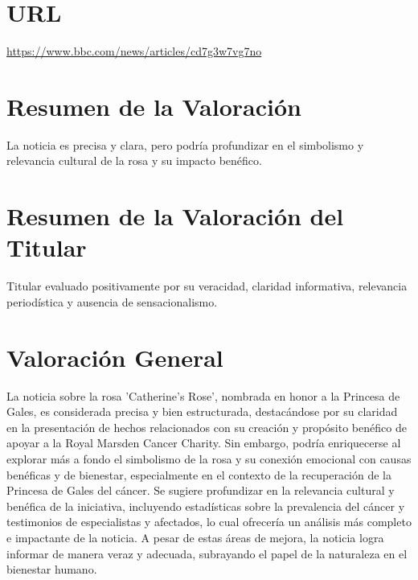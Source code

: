\documentclass[10pt,a4paper]{article}
\begin{document}
\section*{URL}
\url{ https://www.bbc.com/news/articles/cd7g3w7vg7no }
\vspace{1em}

\section*{Resumen de la Valoración}
    La noticia es precisa y clara, pero podr\'{i}a profundizar en el simbolismo y relevancia cultural de la rosa y su impacto ben\'{e}fico.
\vspace{1em}

\section*{Resumen de la Valoración del Titular}
    Titular evaluado positivamente por su veracidad, claridad informativa, relevancia period\'{i}stica y ausencia de sensacionalismo.
\vspace{1em}

\section*{Valoración General}
    La noticia sobre la rosa 'Catherine's Rose', nombrada en honor a la Princesa de Gales, es considerada precisa y bien estructurada, destac\'{a}ndose por su claridad en la presentaci\'{o}n de hechos relacionados con su creaci\'{o}n y prop\'{o}sito ben\'{e}fico de apoyar a la Royal Marsden Cancer Charity. Sin embargo, podr\'{i}a enriquecerse al explorar m\'{a}s a fondo el simbolismo de la rosa y su conexi\'{o}n emocional con causas ben\'{e}ficas y de bienestar, especialmente en el contexto de la recuperaci\'{o}n de la Princesa de Gales del c\'{a}ncer. Se sugiere profundizar en la relevancia cultural y ben\'{e}fica de la iniciativa, incluyendo estad\'{i}sticas sobre la prevalencia del c\'{a}ncer y testimonios de especialistas y afectados, lo cual ofrecer\'{i}a un an\'{a}lisis m\'{a}s completo e impactante de la noticia. A pesar de estas \'{a}reas de mejora, la noticia logra informar de manera veraz y adecuada, subrayando el papel de la naturaleza en el bienestar humano.
\vspace{1em}
\end{document}
